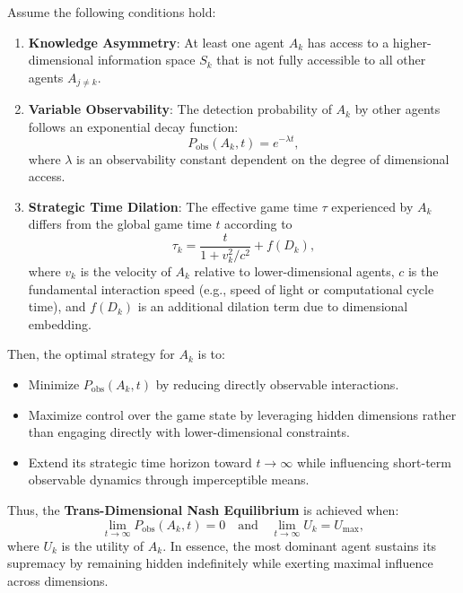 \documentclass[11pt]{article}
\begin{document}
Assume the following conditions hold:
\begin{enumerate}
    \item \textbf{Knowledge Asymmetry}: At least one agent \( A_k \) has access to a higher-dimensional information space \( S_k \) that is not fully accessible to all other agents \( A_{j \neq k} \).
    \item \textbf{Variable Observability}: The detection probability of \( A_k \) by other agents follows an exponential decay function:
    \[
    P_{\text{obs}}(A_k, t) = e^{-\lambda t},
    \]
    where \( \lambda \) is an observability constant dependent on the degree of dimensional access.
    \item \textbf{Strategic Time Dilation}: The effective game time \( \tau \) experienced by \( A_k \) differs from the global game time \( t \) according to
    \[
    \tau_k = \frac{t}{1 + v_k^2 / c^2} + f(D_k),
    \]
    where \( v_k \) is the velocity of \( A_k \) relative to lower-dimensional agents, \( c \) is the fundamental interaction speed (e.g., speed of light or computational cycle time), and \( f(D_k) \) is an additional dilation term due to dimensional embedding.
\end{enumerate}

Then, the optimal strategy for \( A_k \) is to:
\begin{itemize}
    \item Minimize \( P_{\text{obs}}(A_k, t) \) by reducing directly observable interactions.
    \item Maximize control over the game state by leveraging hidden dimensions rather than engaging directly with lower-dimensional constraints.
    \item Extend its strategic time horizon toward \( t \to \infty \) while influencing short-term observable dynamics through imperceptible means.
\end{itemize}

Thus, the \textbf{Trans-Dimensional Nash Equilibrium} is achieved when:
\[
\lim_{t \to \infty} P_{\text{obs}}(A_k, t) = 0 \quad \text{and} \quad \lim_{t \to \infty} U_k = U_{\max},
\]
where \( U_k \) is the utility of \( A_k \). In essence, the most dominant agent sustains its supremacy by remaining hidden indefinitely while exerting maximal influence across dimensions.
\end{document}
